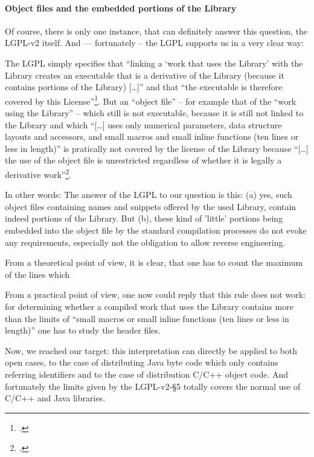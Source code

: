 \paragraph{Object files and the embedded portions of the Library}

Of course, there is only one instance, that can definitely answer this question,
the LGPL-v2 itself. And --- fortunately -- the LGPL supports us in a very clear
way:

The LGPL simply specifies that \enquote{linking a \enquote{work that uses the
Library} with the Library creates an executable that is a derivative of the
Library (because it contains portions of the Library) [\ldots]} and that
\enquote{the executable is therefore covered by this
License}\footcite[cf.][\nopage wp. §5]{Lgpl21OsiLicense199a}. But an
\enquote{object file} -- for example that of the \enquote{work using the
Library} -- which still is not executable, because it is still not linked to the
Library and which \enquote{[\ldots] uses only numerical parameters, data
structure layouts and accessors, and small macros and small inline functions
(ten lines or less in length)} is pratically not covered by the license of the
Library because \enquote{[\ldots] the use of the object file is unrestricted
regardless of whether it is legally a derivative work}\footcite[cf.][\nopage wp.
§5]{Lgpl21OsiLicense199a}.

In other words: The answer of the LGPL to our question is this: (a) yes, such
object files containing names and snippets offered by the used Library, contain
indeed portions of the Library. But (b), these kind of 'little' portions being
embedded into the object file by the standard compilation processes do not evoke
any requirements, especially not the obligation to allow reverse engineering.


From a theoretical point of view, it is clear, that one has to count the maximum
of the lines which 

 From a practical point of view, one now could reply that this rule does not
work: for determining whether a compiled work that uses the Library contains
more than the limits of \enquote{small macros or small inline functions (ten
lines or less in length)} one has to study the header files. 



Now, we reached our target:
this interpretation can directly be applied to both open cases, to the case of
distributing Java byte code which only contains referring identifiers and to the
case of distribution C/C++ object code. And fortunately the limits given by the
LGPL-v2-§5 totally covers the normal use of C/C++ and Java libraries.


